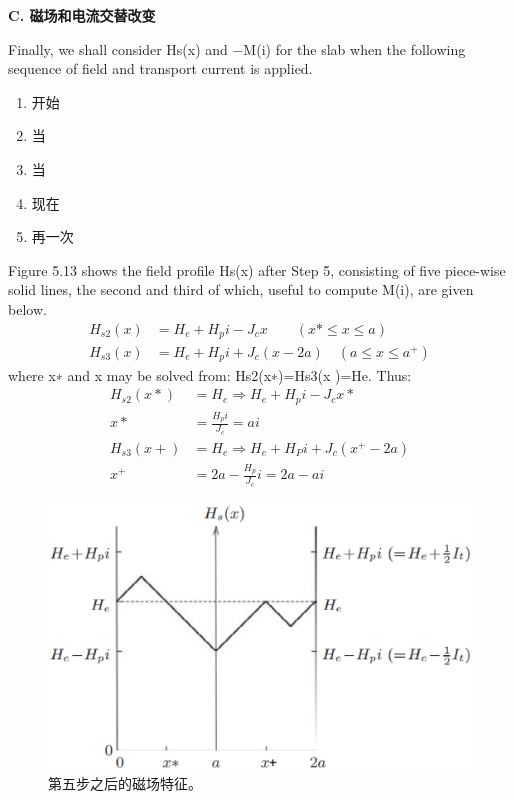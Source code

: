 \textbf{C. 磁场和电流交替改变}

Finally, we shall consider Hs(x) and −M(i) for the slab when the following sequence
of field and transport current is applied.

\begin{enumerate}
	\item 开始
	\item 当
	\item 当
	\item 现在
	\item 再一次
\end{enumerate}

Figure 5.13 shows the field profile Hs(x) after Step 5, consisting of five piece-wise
solid lines, the second and third of which, useful to compute M(i), are given below.
\begin{align*}
H_{s2}(x)&=H_{e}+H_{p}i-J_{c}x\qquad(x*\leq x\leq a)\\
H_{s3}(x)&=H_{e}+H_{p}i+J_{c}(x-2a)\quad(a\leq x\leq a^{+})
\end{align*}
where x∗ and x may be solved from: Hs2(x∗)=Hs3(x )=He. Thus:
\begin{align*}
H_{s2}(x*)&=H_{e}\Rightarrow H_{e}+H_{p}i-J_{c}x*\\
x*&=\frac{H_{p}i}{J_{c}}=ai\\
H_{s3}(x+)&=H_{e}\Rightarrow H_{e}+H_{P}i+J_{c}(x^{+}-2a)\\
x^{+}&=2a-\frac{H_{p}}{J_{c}}i=2a-ai
\end{align*}

\begin{figure}[htbp]
	\centering
	\includegraphics[scale=0.5]{chpt5/figs/fig5.13.eps}
	\caption{第五步之后的磁场特征。}
\end{figure}

